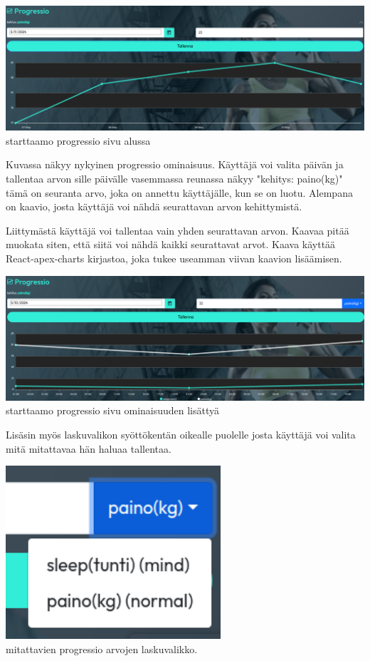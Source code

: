 \includegraphics[width= 15cm]{src/public/progressiosingle.png} \\
starttaamo progressio sivu alussa
\medskip

Kuvassa näkyy nykyinen progressio ominaisuus. Käyttäjä voi valita päivän ja tallentaa arvon sille päivälle
vasemmassa reunassa näkyy "kehitys: paino(kg)"{} tämä on seuranta arvo, joka on annettu käyttäjälle, kun se on luotu.
Alempana on kaavio, josta käyttäjä voi nähdä seurattavan arvon kehittymistä. 
\medskip


Liittymästä käyttäjä voi tallentaa vain yhden seurattavan arvon. 
Kaavaa pitää muokata siten, että siitä voi nähdä kaikki seurattavat arvot.
Kaava käyttää React-apex-charts kirjastoa, joka tukee useamman viivan kaavion lisäämisen.
\medskip



\includegraphics[width= 15cm]{src/public/progressmulti.png} \\
starttaamo progressio sivu ominaisuuden lisättyä
\medskip


Lisäsin myös laskuvalikon syöttökentän oikealle puolelle josta käyttäjä voi valita mitä mitattavaa hän haluaa tallentaa.

\iffalse

\includegraphics[width= 8cm]{src/public/progressselect.png} \\
mitattavien progressio arvojen laskuvalikko.
\medskip

